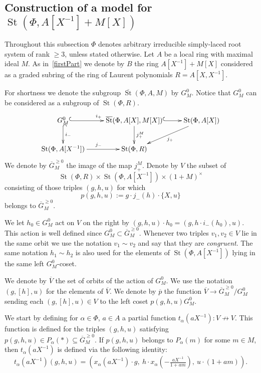 \documentclass[oneside, 8pt]{amsart}
\theoremstyle{remark}
\theoremstyle{definition}
\numberwithin{lemma}{section}
\numberwithin{prop}{section}
\numberwithin{corollary}{section}
\DeclareMathOperator{\St}{St}
\newcommand{\inv}{^{-1}}
\numberwithin{equation}{section}
\begin{document}
\subsection{Construction of a model for $\St(\Phi, A[X\inv] + M[X])$}
Throughout this subsection $\Phi$ denotes arbitrary irreducible simply-laced root system of rank $\geq 3$, unless stated otherwise. Let $A$ be a local ring with maximal ideal $M$. As in~\cref{firstPart} we denote by $B$ the ring $A[X\inv] + M[X]$ considered as a graded subring of the ring of Laurent polynomials $R = A[X, X\inv]$.

For shortness we denote the subgroup $\overline{\St}(\Phi, A, M)$ by $G_M^0$.
Notice that $G_M^0$ can be considered as a subgroup of $\St(\Phi, R)$.
\[ \xymatrix{ G_M^0 \ar@{^{(}->}[r]^{i_+} \ar@{^{(}->}[d]^{i_-} & \overline{\St}(\Phi, A[X], M[X]) \ar^{j_+^M}[d] \ar@{^{(}->}[r] & \St(\Phi, A[X]) \ar[dl]^{j_+} \\
              \St(\Phi, A[X\inv]) \ar[r]^{j_-} & \St(\Phi, R) &  } \] 
We denote by $\overline{G}^{\geq 0}_M$ the image of the map $j_+^M$. 
Denote by $V$ the subset of \[\St(\Phi, R) \times \St(\Phi, A[X\inv]) \times (1 + M)^\times\] consisting of those triples $(g, h, u)$ for which
\[p(g, h, u) := g \cdot j_-(h) \cdot \{ X, u \}\] belongs to $\overline{G}_M^{\geq 0}$.

We let $h_0 \in G_M^0$ act on $V$ on the right by $(g, h, u) \cdot h_0 = (g, h \cdot i_-(h_0), u)$. This action is well defined since $G^0_M \subset \overline{G}^{\geq 0}_M$. Whenever two triples $v_1, v_2 \in V$ lie in the same orbit we use the notation $v_1 \sim v_2$ and say that they are {\it congruent}. The same notation $h_1 \sim h_2$ is also used for the elements of $\St(\Phi, A[X\inv])$ lying in the same left $G^0_M$-coset.

We denote by $\overline{V}$ the set of orbits of the action of $G_M^0$.
We use the notation $(g, [h], u)$ for the elements of $\overline{V}$.
We denote by $\overline{p}$ the function $\overline{V} \to \overline{G}^{\geq 0}_M/G_M^0$ sending each $(g, [h], u) \in V$ to the left coset $p(g, h, u)G_M^0$.

We start by defining for $\alpha \in \Phi$, $a \in A$ a partial function $t_\alpha(aX^{-1}) \colon V \not\to V$.
This function is defined for the triples $(g, h, u)$ satisfying $p(g, h, u) \in P_\alpha(*) \subseteq \overline{G}_M^{\geq 0}$.
If $p(g, h, u)$ belongs to $P_\alpha(m)$ for some $m \in M$, then $t_\alpha(aX^{-1})$ is defined via the following identity:
\begin{equation} \label{T_1} t_\alpha(aX^{-1}) (g, h, u) = \left( x_\alpha(aX^{-1})\cdot g ,\ h \cdot x_\alpha\left(-\tfrac{aX^{-1}}{1 + am}\right),\ u \cdot (1 + am)\right).\end{equation}
\end{document}

